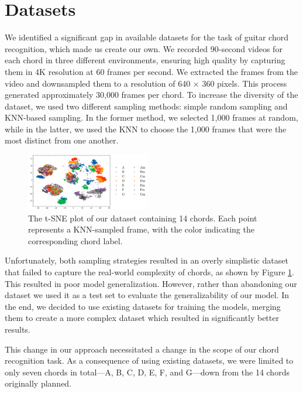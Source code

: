 \documentclass[10pt,twocolumn,letterpaper]{article}
\begin{document}
\section{Datasets}
We identified a significant gap in available datasets for the task of guitar chord recognition, which made us create our own. We recorded 90-second videos for each chord in three different environments, ensuring high quality by capturing them in 4K resolution at 60 frames per second. We extracted the frames from the video and downsampled them to a resolution of 640 $\times$ 360 pixels. This process generated approximately 30,000 frames per chord. To increase the diversity of the dataset, we used two different sampling methods: simple random sampling and KNN-based sampling. In the former method, we selected 1,000 frames at random, while in the latter, we used the KNN to choose the 1,000 frames that were the most distinct from one another.

\begin{figure}[h]
    \centering
    \includegraphics[width=0.48\textwidth]{images/final/Guitar-chords-ours_t-sne_plot.png}
    \caption{The t-SNE plot of our dataset containing 14 chords. Each point represents a KNN-sampled frame, with the color indicating the corresponding chord label.}
    \label{fig:ours-tsne-plot}
\end{figure}

Unfortunately, both sampling strategies resulted in an overly simplistic dataset that failed to capture the real-world complexity of chords, as shown by Figure \ref{fig:ours-tsne-plot}. This resulted in poor model generalization. However, rather than abandoning our dataset we used it as a test set to evaluate the generalizability of our model. In the end, we decided to use existing datasets \cite{guitar-chord-tvon8_dataset,guitar-chord-bounding-box_dataset, guitar-chord-handshape_dataset, guitar-chords-daewp_dataset} for training the models, merging them to create a more complex dataset which resulted in significantly better results.

This change in our approach necessitated a change in the scope of our chord recognition task. As a consequence of using existing datasets, we were limited to only seven chords in total—A, B, C, D, E, F, and G—down from the 14 chords originally planned.
\end{document}
